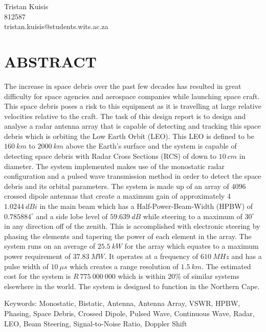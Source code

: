 \documentclass[11pt]{witseiepaper}
\begin{document}
\begin{bibunit}[witseie]
\begin{center}
\vspace{2cm}
{\Large Tristan Kuisis} \\
{\small 812587} \\
{\small tristan.kuisis@students.wits.ac.za}
\end{center}

\section*{ABSTRACT}
The increase in space debris over the past few decades has resulted in great difficulty for space agencies and aerospace companies while launching space craft. This space debris poses a risk to this equipment as it is travelling at large relative velocities relative to the craft.
The task of this design report is to design and analyse a radar antenna array that is capable of detecting and tracking this space debris which is orbiting the Low Earth Orbit (LEO). This LEO is defined to be $160~km$ to $2000~km$ above the Earth's surface and the system is capable of detecting space debris with Radar Cross Sections (RCS) of down to $10~cm$ in diameter.
The system implemented makes use of the monostatic radar configuration and a pulsed wave transmission method in order to detect the space debris and its orbital parameters.
The system is made up of an array of $4096$ crossed dipole antennas that create a maximum gain of approximately 4$1.0244~dBi$ in the main beam which has a Half-Power-Beam-Width (HPBW) of $0.785884^{\circ}$ and a side lobe level of $59.639~dB$ while steering to a maximum of $30^{\circ}$ in any direction off of the zenith. This is accomplished with electronic steering by phasing the elements and tapering the power of each element in the array.
The system runs on an average of $25.5~kW$ for the array which equates to a maximum power requirement of $37.83~MW$. It operates at a frequency of $610~MHz$ and has a pulse width of $10~\mu s$ which creates a range resolution of $1.5~km$.
The estimated cost for the system is $R~775~000~000$ which is within $20\%$ of similar systems elsewhere in the world. The system is designed to function in the Northern Cape.

Keywords: Monostatic, Bistatic, Antenna, Antenna Array, VSWR, HPBW, Phasing, Space Debris, Crossed Dipole, Pulsed Wave, Continuous Wave, Radar, LEO, Beam Steering, Signal-to-Noise Ratio, Doppler Shift
\clearpage


\clearpage


\end{bibunit}
\end{document}
